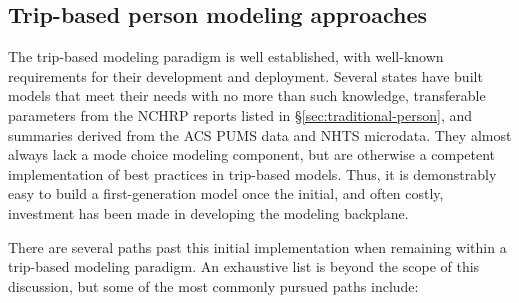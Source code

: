 \subsection{Trip-based person modeling approaches}

The trip-based modeling paradigm is well established, with well-known requirements for their development and deployment. Several states have built models that meet their needs with no more than such knowledge, transferable parameters from the NCHRP reports listed in \S\ref{sec:traditional-person}, and summaries derived from the ACS PUMS data and NHTS microdata. They almost always lack a mode choice modeling component, but are otherwise a competent implementation of best practices in trip-based models. Thus, it is demonstrably easy to build a first-generation model once the initial, and often costly, investment has been made in developing the modeling backplane.

There are several paths past this initial implementation when remaining within a trip-based modeling paradigm. An exhaustive list is beyond the scope of this discussion, but some of the most commonly pursued paths include:

